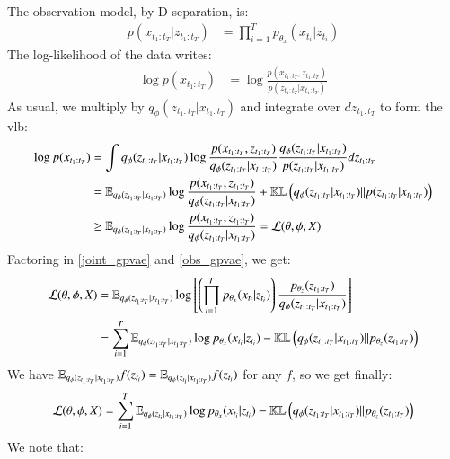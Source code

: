 The observation model, by D-separation, is:
\begin{align}
\label{obs_gpvae}
    p(x_{t_1:t_T} \vert z_{t_1:t_T}) &= \prod_{i=1}^T p_{\theta_x}(x_{t_i} \vert z_{t_i})
\end{align}
The log-likelihood of the data writes:
\begin{align}
    \log{p(x_{t_1:t_T})} &= \log{\frac{p(x_{t_1:t_T}, z_{t_1:t_T})}{p(z_{t_1:t_T} \vert x_{t_1:t_T})}}
\end{align}
As usual, we multiply by $q_{\phi}(z_{t_1:t_T} \vert x_{t_1:t_T})$ and integrate over $dz_{t_1:t_T}$ to form the \gls{vlb}:
\begin{align}
    \log{p(x_{t_1:t_T})} &= \int q_{\phi}(z_{t_1:t_T} \vert x_{t_1:t_T}) \log{\frac{p(x_{t_1:t_T}, z_{t_1:t_T})}{q_{\phi}(z_{t_1:t_T}\vert x_{t_1:t_T})}\frac{q_{\phi}(z_{t_1:t_T}\vert x_{t_1:t_T})}{p(z_{t_1:t_T} \vert x_{t_1:t_T})}} dz_{t_1:t_T} \\
    &= \mathbb{E}_{q_{\phi}(z_{t_1:t_T} \vert x_{t_1:t_T})} \log{\frac{p(x_{t_1:t_T}, z_{t_1:t_T})}{q_{\phi}(z_{t_1:t_T} \vert x_{t_1:t_T})}} + \mathbb{KL}\left( q_{\phi}(z_{t_1:t_T} \vert x_{t_1:t_T}) \vert\vert p(z_{t_1:t_T} \vert x_{t_1:t_T}) \right) \\
    &\geq \mathbb{E}_{q_{\phi}(z_{t_1:t_T} \vert x_{t_1:t_T})} \log{\frac{p(x_{t_1:t_T}, z_{t_1:t_T})}{q_{\phi}(z_{t_1:t_T} \vert x_{t_1:t_T})}} = \mathcal{L}(\theta, \phi, X)
\end{align}
Factoring in \ref{joint_gpvae} and \ref{obs_gpvae}, we get:
\begin{align}
    \mathcal{L}(\theta, \phi, X) &= \mathbb{E}_{q_{\phi}(z_{t_1:t_T} \vert x_{t_1:t_T})} \log{\left[ \left( \prod_{i=1}^T p_{\theta_x}(x_{t_i} \vert z_{t_i}) \right) \frac{p_{\theta_z}(z_{t_1:t_T})}{q_{\phi}(z_{t_1:t_T} \vert x_{t_1:t_T})}
    \right]} \\
    &= \sum_{i=1}^T \mathbb{E}_{q_{\phi}(z_{t_1:t_T} \vert x_{t_1:t_T})} \log{p_{\theta_x}(x_{t_i} \vert z_{t_i})} - \mathbb{KL}\left( q_{\phi}(z_{t_1:t_T} \vert x_{t_1:t_T}) \vert\vert p_{\theta_z}(z_{t_1:t_T}) \right)
\end{align}
We have $\mathbb{E}_{q_{\phi}(z_{t_1:t_T} \vert x_{t_1:t_T})} f(z_{t_i}) = \mathbb{E}_{q_{\phi}(z_{t_i} \vert x_{t_1:t_T})} f(z_{t_i})$ for any $f$, so we get finally:
\begin{align}
    \mathcal{L}(\theta, \phi, X) = \sum_{i=1}^T \mathbb{E}_{q_{\phi}(z_{t_i} \vert x_{t_1:t_T})} \log{p_{\theta_x}(x_{t_i} \vert z_{t_i})} - \mathbb{KL}\left( q_{\phi}(z_{t_1:t_T} \vert x_{t_1:t_T}) \vert\vert p_{\theta_z}(z_{t_1:t_T}) \right)
\end{align}
We note that:
